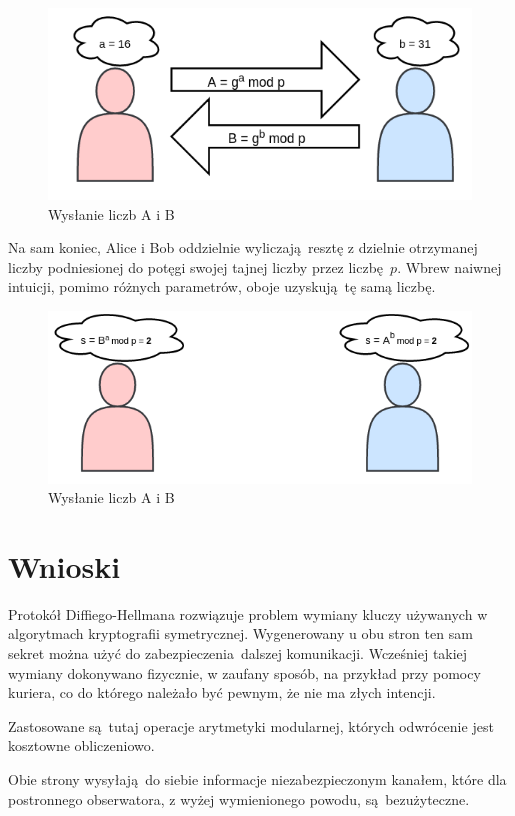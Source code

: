 \documentclass[12pt]{article}
\begin{document}
\begin{figure}[h!]
	\begin{center}
		\includegraphics[scale=0.3]{4-dh-diagram-2}
	\end{center}
	\caption{Wysłanie liczb A i B}
\end{figure}

Na sam koniec, Alice i Bob oddzielnie wyliczają resztę z dzielnie otrzymanej liczby podniesionej do potęgi swojej tajnej liczby przez liczbę $p$.
Wbrew naiwnej intuicji, pomimo różnych parametrów, oboje uzyskują tę samą liczbę.

\begin{figure}[h!]
	\begin{center}
		\includegraphics[scale=0.3]{4-dh-diagram-3}
	\end{center}
	\caption{Wysłanie liczb A i B}
\end{figure}

\section{Wnioski}

Protokół Diffiego-Hellmana rozwiązuje problem wymiany kluczy używanych w algorytmach
kryptografii symetrycznej.
Wygenerowany u obu stron ten sam sekret można użyć do zabezpieczenia dalszej
komunikacji.
Wcześniej takiej wymiany dokonywano fizycznie, w zaufany sposób, na przykład
przy pomocy kuriera, co do którego należało być pewnym, że nie ma złych intencji.

Zastosowane są tutaj operacje arytmetyki modularnej, których odwrócenie
jest kosztowne obliczeniowo.

Obie strony wysyłają do siebie informacje niezabezpieczonym kanałem,
które dla postronnego obserwatora, z wyżej wymienionego powodu, są bezużyteczne.
\end{document}
